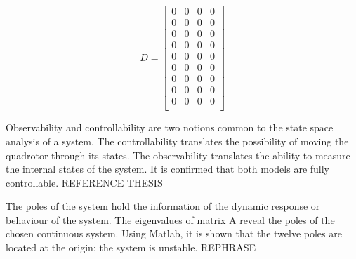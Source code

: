   \begin{equation}
 	D=\begin{bmatrix}
 	0 & 0 & 0 & 0 \\
 	0 & 0 & 0 & 0 \\
 	0 & 0 & 0 & 0 \\
 	0 & 0 & 0 & 0 \\
 	0 & 0 & 0 & 0 \\
 	0 & 0 & 0 & 0 \\
 	0 & 0 & 0 & 0 \\
 	0 & 0 & 0 & 0 \\
 	0 & 0 & 0 & 0 \\
 	\end{bmatrix}
 \end{equation}
 
Observability and controllability are two notions common to the state space analysis of a system. The controllability translates the possibility of moving the quadrotor through its states. The observability translates the ability to measure the internal states of the system. It is confirmed that both models are fully controllable. REFERENCE THESIS

The poles of the system hold the information of the dynamic response or behaviour of the system. The eigenvalues of matrix A reveal the poles of the chosen continuous system. Using Matlab, it is shown that the twelve poles are located at the origin; the system is unstable. REPHRASE